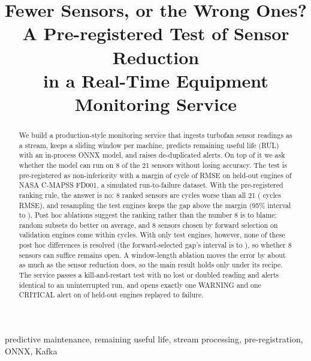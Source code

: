 \documentclass[conference]{IEEEtran}
\begin{document}
\title{Fewer Sensors, or the Wrong Ones?\\A Pre-registered Test of Sensor Reduction\\in a Real-Time Equipment Monitoring Service}

\author{
}

\maketitle

\begin{abstract}
We build a production-style monitoring service that ingests turbofan sensor readings as a stream, keeps a
sliding window per machine, predicts remaining useful life (RUL) with an in-process ONNX model, and raises
de-duplicated alerts. On top of it we ask whether the model can run on 8 of the 21 sensors without losing
accuracy. The test is pre-registered as non-inferiority with a margin of \Margin{} cycle of RMSE on held-out
engines of NASA C-MAPSS FD001, a simulated run-to-failure dataset. With the pre-registered ranking rule, the
answer is no: 8 ranked sensors are \HypGap{} cycles worse than all 21 (\MainGbrFullTwoOneTestRmse{} cycles RMSE), and
resampling the test engines keeps the gap above the margin (95\% interval \BootReducedEightGapLow{} to
\BootReducedEightGapHigh{}). Post hoc ablations suggest the ranking rather than the number 8 is to blame: random subsets
do better on average, and 8 sensors chosen by forward selection on validation engines come within \GreedyEightGap{}
cycles. With only \SplitTest{} test engines, however, none of these post hoc differences is resolved (the forward-selected
gap's interval is \BootGreedyEightGapLow{} to \BootGreedyEightGapHigh{}), so whether 8 sensors can suffice remains open.
A window-length ablation moves the error by about as much as the sensor reduction does, so the main result
holds only under its recipe. The service passes a kill-and-restart test with no lost or doubled reading and
alerts identical to an uninterrupted run, and opens exactly one WARNING and one CRITICAL alert on
\AlertReplayTestEnginesPassing{} of \AlertReplayTestEngines{} held-out engines replayed to failure.
\end{abstract}

\begin{IEEEkeywords}
predictive maintenance, remaining useful life, stream processing, pre-registration, ONNX, Kafka
\end{IEEEkeywords}
\end{document}
